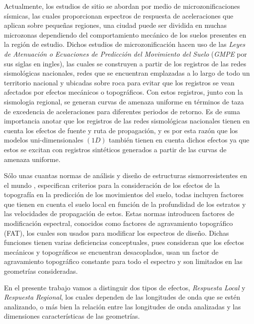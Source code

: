\documentclass[spanish,letterpaper,12pt,twoside,openany]{article}
\begin{document}
Actualmente, los estudios de sitio se abordan por medio de microzonificaciones sísmicas, las cuales proporcionan espectros de respuesta de aceleraciones que aplican sobre pequeñas regiones, una ciudad puede ser dividida en muchas microzonas dependiendo del comportamiento mecánico de los suelos presentes en la región de estudio. Dichos estudios de microzonificación hacen uso de las \textit{Leyes de Atenuación o Ecuaciones de Predicción del Movimiento del Suelo} (\textit{GMPE} por sus siglas en ingles), las cuales se construyen a partir de los registros de las redes sismológicas nacionales, redes que se encuentran emplazadas a lo largo de todo un territorio nacional y ubicadas sobre roca para evitar que los registros se vean afectados por efectos mecánicos o topográficos. Con estos registros, junto con la sismologia regional, se generan curvas de amenaza uniforme en términos de taza de excedencia de aceleraciones para diferentes periodos de retorno. Es de suma importancia anotar que los registros de las redes sismológicas nacionales tienen en cuenta los efectos de fuente y ruta de propagación, y es por esta razón que los modelos uni-dimensionales $\left( 1D \right)$ también tienen en cuenta dichos efectos ya que estos se excitan con registros sintéticos generados a partir de las curvas de amenaza uniforme.

Sólo unas cuantas normas de análisis y diseño de estructuras sismorresistentes en el mundo \citep{EC8, AFPS1995}, especifican criterios para la consideración de los efectos de la topografía en la predicción de los movimientos del suelo, todas incluyen factores que tienen en cuenta el suelo local en función de la profundidad de los estratos y las velocidades de propagación de estos. Estas normas introducen factores de modificación espectral, conocidos como factores de agravamiento topográfico (FAT), los cuales son usados para modificar los espectros de diseño. Dichas funciones tienen varias deficiencias conceptuales, pues consideran que los efectos mecánicos y topográficos se encuentran desacoplados, usan un factor de agravamiento topográfico constante para todo el espectro y son limitados en las geometrías consideradas.

En el presente trabajo vamos a distinguir dos tipos de efectos, \textit{Respuesta Local} y \textit{Respuesta Regional}, los cuales dependen de las longitudes de onda que se estén analizando, o más bien la relación entre las longitudes de onda analizadas y las dimensiones características de las geometrías.
\end{document}
